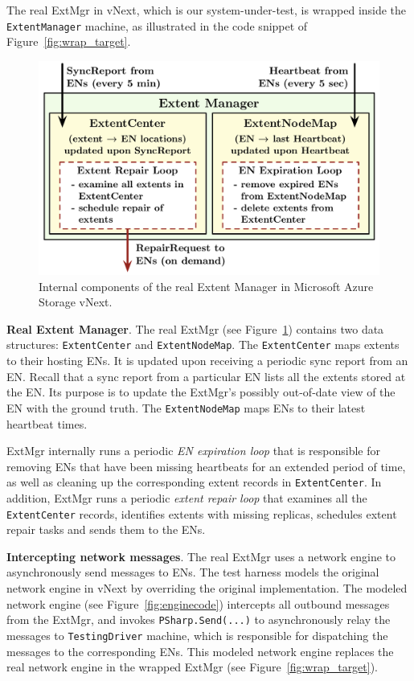 The real ExtMgr in vNext, which is our system-under-test, is wrapped inside the \texttt{ExtentManager} machine, as illustrated in the code snippet of Figure~\ref{fig:wrap_target}.

\begin{figure}[t]
\centering
\includegraphics[width=.95\linewidth]{img/extent_manager}
\vspace{-3mm}
\caption{Internal components of the real Extent Manager in Microsoft Azure Storage vNext.}
\label{fig:extentmanager}
\vspace{-3mm}
\end{figure}

\textbf{Real Extent Manager}.
The real ExtMgr (see Figure~\ref{fig:extentmanager}) contains two data structures: \texttt{ExtentCenter} and \texttt{ExtentNodeMap}. The \texttt{ExtentCenter} maps extents to their hosting ENs. It is updated upon receiving a periodic sync report from an EN. Recall that a sync report from a particular EN lists all the extents stored at the EN. Its purpose is to update the ExtMgr's possibly out-of-date view of the EN with the ground truth. The \texttt{ExtentNodeMap} maps ENs to their latest heartbeat times.

ExtMgr internally runs a periodic \emph{EN expiration loop} that is responsible for removing ENs that have been missing heartbeats for an extended period of time, as well as cleaning up the corresponding extent records in \texttt{ExtentCenter}. In addition, ExtMgr runs a periodic \emph{extent repair loop} that examines all the \texttt{ExtentCenter} records, identifies extents with missing replicas, schedules extent repair tasks and sends them to the ENs.

\textbf{Intercepting network messages}.
The real ExtMgr uses a network engine to asynchronously send messages to ENs. The \psharp test harness models the original network engine in vNext by overriding the original implementation. The modeled network engine (see Figure~\ref{fig:enginecode}) intercepts all outbound messages from the ExtMgr, and invokes \texttt{PSharp.Send(...)} to asynchronously relay the messages to \texttt{TestingDriver} machine, which is responsible for dispatching the messages to the corresponding ENs. This modeled network engine replaces the real network engine in the wrapped ExtMgr (see Figure~\ref{fig:wrap_target}).

